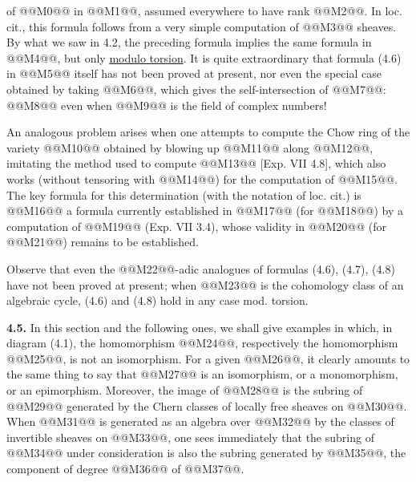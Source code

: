 of @@M0@@ in @@M1@@, assumed everywhere to have rank @@M2@@. In loc. cit., this formula follows from a very simple computation of @@M3@@ sheaves. By what we saw in 4.2, the preceding formula implies the same formula in @@M4@@, but only \uline{modulo torsion}. It is quite extraordinary that formula (4.6) in @@M5@@ itself has not been proved at present, nor even the special case obtained by taking @@M6@@, which gives the self-intersection of @@M7@@:
@@M8@@
even when @@M9@@ is the field of complex numbers!

An analogous problem arises when one attempts to compute the Chow ring of the variety @@M10@@ obtained by blowing up @@M11@@ along @@M12@@, imitating the method used to compute @@M13@@ [Exp. VII 4.8], which also works (without tensoring with @@M14@@) for the computation of @@M15@@. The key formula for this determination (with the notation of loc. cit.) is
@@M16@@
a formula currently established in @@M17@@ (for @@M18@@) by a computation of @@M19@@ (Exp. VII 3.4), whose validity in @@M20@@ (for @@M21@@) remains to be established.

Observe that even the @@M22@@-adic analogues of formulas (4.6), (4.7), (4.8) have not been proved at present; when @@M23@@ is the cohomology class of an algebraic cycle, (4.6) and (4.8) hold in any case mod. torsion.

\textbf{4.5.} In this section and the following ones, we shall give examples in which, in diagram (4.1), the homomorphism @@M24@@, respectively the homomorphism @@M25@@, is not an isomorphism. For a given @@M26@@, it clearly amounts to the same thing to say that
@@M27@@
is an isomorphism, or a monomorphism, or an epimorphism. Moreover, the image of @@M28@@ is the subring of @@M29@@ generated by the Chern classes of locally free sheaves on @@M30@@. When @@M31@@ is generated as an algebra over @@M32@@ by the classes of invertible sheaves on @@M33@@, one sees immediately that the subring of @@M34@@ under consideration is also the subring generated by @@M35@@, the component of degree @@M36@@ of @@M37@@.

